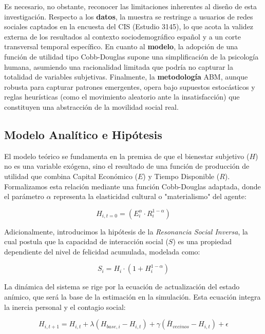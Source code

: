 \documentclass[a4paper,12pt]{article}
\begin{document}
Es necesario, no obstante, reconocer las limitaciones inherentes al diseño de esta investigación. Respecto a los \textbf{datos}, la muestra se restringe a usuarios de redes sociales captados en la encuesta del CIS (Estudio 3145), lo que acota la validez externa de los resultados al contexto sociodemográfico español y a un corte transversal temporal específico. En cuanto al \textbf{modelo}, la adopción de una función de utilidad tipo Cobb-Douglas supone una simplificación de la psicología humana, asumiendo una racionalidad limitada que podría no capturar la totalidad de variables subjetivas. Finalmente, la \textbf{metodología} ABM, aunque robusta para capturar patrones emergentes, opera bajo supuestos estocásticos y reglas heurísticas (como el movimiento aleatorio ante la insatisfacción) que constituyen una abstracción de la movilidad social real.

\subsection{Modelo Analítico e Hipótesis}

El modelo teórico se fundamenta en la premisa de que el bienestar subjetivo ($H$) no es una variable exógena, sino el resultado de una función de producción de utilidad que combina Capital Económico ($E$) y Tiempo Disponible ($R$). Formalizamos esta relación mediante una función Cobb-Douglas adaptada, donde el parámetro $\alpha$ representa la elasticidad cultural o "materialismo" del agente:

\begin{equation}
    H_{i,t=0} = (E_i^\alpha \cdot R_i^{1-\alpha})
\end{equation}

Adicionalmente, introducimos la hipótesis de la \textit{Resonancia Social Inversa}, la cual postula que la capacidad de interacción social ($S$) es una propiedad dependiente del nivel de felicidad acumulada, modelada como:

\begin{equation}
    S_i = H_i \cdot (1 + H_i^{1-\alpha})
\end{equation}

La dinámica del sistema se rige por la ecuación de actualización del estado anímico, que será la base de la estimación en la simulación. Esta ecuación integra la inercia personal y el contagio social:

\begin{equation}
    H_{i, t+1} = H_{i, t} + \lambda(H_{base, i} - H_{i, t}) + \gamma(\bar{H}_{vecinos} - H_{i, t}) + \epsilon
\end{equation}
\end{document}
